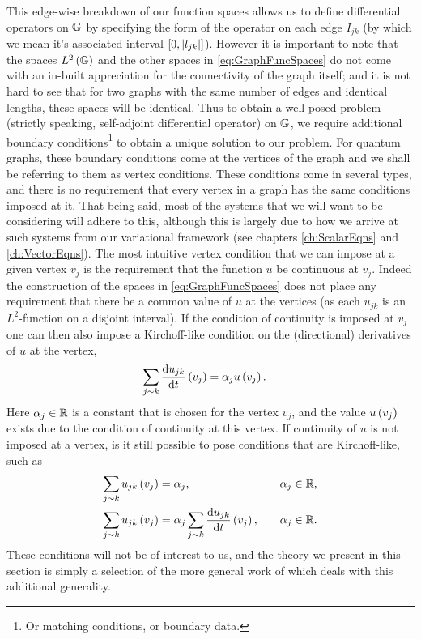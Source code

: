 This edge-wise breakdown of our function spaces allows us to define differential operators on $\mathbb{G}$ by specifying the form of the operator on each edge $I_{jk}$ (by which we mean it's associated interval $\left[ 0,\left\lvert l_{jk} \right\rvert \right]$).
However it is important to note that the spaces $L^2\left( \mathbb{G} \right)$ and the other spaces in \eqref{eq:GraphFuncSpaces} do not come with an in-built appreciation for the connectivity of the graph itself; and it is not hard to see that for two graphs with the same number of edges and identical lengths, these spaces will be identical.
Thus to obtain a well-posed problem (strictly speaking, self-adjoint differential operator) on $\mathbb{G}$, we require additional boundary conditions\footnote{Or matching conditions, or boundary data.} to obtain a unique solution to our problem.
For quantum graphs, these boundary conditions come at the vertices of the graph and we shall be referring to them as vertex conditions.
These conditions come in several types, and there is no requirement that every vertex in a graph has the same conditions imposed at it.
That being said, most of the systems that we will want to be considering will adhere to this, although this is largely due to how we arrive at such systems from our variational framework (see chapters \ref{ch:ScalarEqns} and \ref{ch:VectorEqns}).
The most intuitive vertex condition that we can impose at a given vertex $v_j$ is the requirement that the function $u$ be continuous at $v_j$.
Indeed the construction of the spaces in \eqref{eq:GraphFuncSpaces} does not place any requirement that there be a common value of $u$ at the vertices (as each $u_{jk}$ is an $L^2$-function on a disjoint interval).
If the condition of continuity is imposed at $v_j$ one can then also impose a Kirchoff-like condition on the (directional) derivatives of $u$ at the vertex,
\begin{align*}
	\sum_{j\sim k}\dfrac{\mathrm{d}u_{jk}}{\mathrm{d}t}\left( v_j \right) &= \alpha_j u\left( v_j \right).
\end{align*}
Here $\alpha_j\in\mathbb{R}$ is a constant that is chosen for the vertex $v_j$, and the value $u\left( v_j \right)$ exists due to the condition of continuity at this vertex.
If continuity of $u$ is not imposed at a vertex, is it still possible to pose conditions that are Kirchoff-like, such as
\begin{align*}
	\sum_{j\sim k}u_{jk}\left( v_j \right) &= \alpha_j, &\quad \alpha_j\in\mathbb{R}, \\
	\sum_{j\sim k}u_{jk}\left( v_j \right) &= \alpha_j \sum_{j\sim k}\dfrac{\mathrm{d}u_{jk}}{\mathrm{d}t}\left( v_j \right), &\quad \alpha_j\in\mathbb{R}.
\end{align*}
These conditions will not be of interest to us, and the theory we present in this section is simply a selection of the more general work of  which deals with this additional generality. \newline

